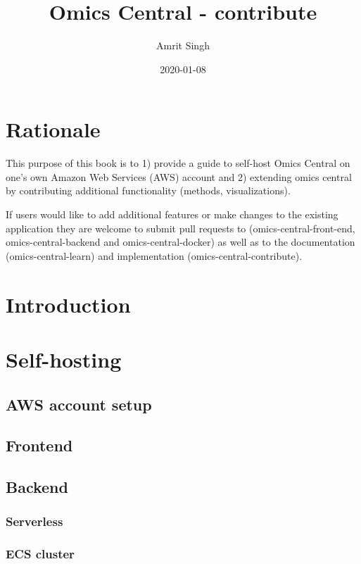 \documentclass[]{book}
\title{Omics Central - contribute}
\author{Amrit Singh}
\date{2020-01-08}
\begin{document}
\maketitle

{
\setcounter{tocdepth}{1}
\tableofcontents
}
\chapter*{Rationale}\label{rationale}

This purpose of this book is to 1) provide a guide to self-host Omics
Central on one's own Amazon Web Services (AWS) account and 2) extending
omics central by contributing additional functionality (methods,
visualizations).

If users would like to add additional features or make changes to the
existing application they are welcome to submit pull requests to
(omics-central-front-end, omics-central-backend and
omics-central-docker) as well as to the documentation
(omics-central-learn) and implementation (omics-central-contribute).

\chapter{Introduction}\label{intro}

\chapter{Self-hosting}\label{self}

\section{AWS account setup}\label{aws-account-setup}

\section{Frontend}\label{frontend}

\section{Backend}\label{backend}

\subsection{Serverless}\label{serverless}

\subsection{ECS cluster}\label{ecs-cluster}
\end{document}
